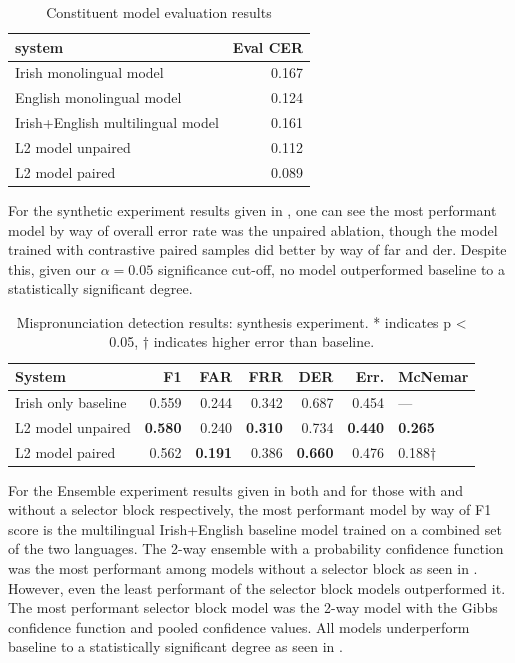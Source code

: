\documentclass[thesis]{cluu}
\begin{document}
\begin{table}[h]
\centering
\caption{Constituent model evaluation results}
\label{tab:model_eval}
\begin{tabular}{lr}
\toprule
system & Eval CER \\
\midrule
Irish monolingual model & 0.167  \\
English monolingual model & 0.124 \\
Irish+English multilingual model & 0.161  \\
L2 model unpaired & 0.112  \\
L2 model paired & 0.089  \\
\bottomrule
\end{tabular}
\end{table}
For the synthetic experiment results given in , one can see the most performant model by way of overall error rate was the unpaired ablation, though the model trained with contrastive paired samples did better by way of \gls{far} and \gls{der}. Despite this, given our $\alpha=0.05$ significance cut-off, no model outperformed baseline to a statistically significant degree. 
\begin{table}
\caption{Mispronunciation detection results: synthesis experiment. * indicates p < 0.05, † indicates higher error than baseline.}
\label{tab:results_synthesis}
\begin{tabular}{lrrrrrl}
\toprule
System & F1 & FAR & FRR & DER & Err. & McNemar \\
\midrule
Irish only baseline & 0.559 & 0.244 & 0.342 & 0.687 & 0.454 & — \\
L2 model unpaired & \textbf{0.580} & 0.240 & \textbf{0.310} & 0.734 & \textbf{0.440} & \textbf{0.265} \\
L2 model paired & 0.562 & \textbf{0.191} & 0.386 & \textbf{0.660} & 0.476 & 0.188† \\
\bottomrule
\end{tabular}
\end{table}

For the Ensemble experiment results given in both  and  for those with and without a selector block respectively, the most performant model by way of F1 score is the multilingual Irish+English baseline model trained on a combined set of the two languages. The 2-way ensemble with a probability confidence function was the most performant among models without a selector block as seen in . However, even the least performant of the selector block models outperformed it. The most performant selector block model was the 2-way model with the Gibbs confidence function and pooled confidence values. All models underperform baseline to a statistically significant degree as seen in .
\end{document}
